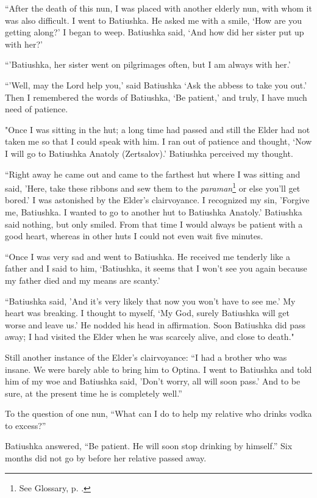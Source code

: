 “After the death of this nun, I was placed with another elderly nun, with whom it was also difficult. I went to Batiushka. He asked me with a smile, ‘How are you getting along?' I began to weep. Batiushka said, ‘And how did her sister put up with her?'

“'Batiushka, her sister went on pilgrimages often, but I am always with her.'

“'Well, may the Lord help you,' said Batiushka ‘Ask the abbess to take you out.' Then I remembered the words of Batiushka, ‘Be patient,' and truly, I have much need of patience.

"Once I was sitting in the hut; a long time had passed and still the Elder had not taken me so that I could speak with him. I ran out of patience and thought, ‘Now I will go to Batiushka Anatoly (Zertsalov).' Batiushka perceived my thought.

“Right away he came out and came to the farthest hut where I was sitting and said, 'Here, take these ribbons and sew them to the \textit{paraman}\footnote{See Glossary, p. \pageref{paraman}.} or else you'll get bored.' I was astonished by the Elder's clairvoyance. I recognized my sin, 'Forgive me, Batiushka. I wanted to go to another hut to Batiushka Anatoly.' Batiushka said nothing, but only smiled. From that time I would always be patient with a good heart, whereas in other huts I could not even wait five minutes.

“Once I was very sad and went to Batiushka. He received me tenderly like a father and I said to him, ‘Batiushka, it seems that I won't see you again because my father died and my means are scanty.'

“Batiushka said, 'And it's very likely that now you won't have to see me.' My heart was breaking. I thought to myself, ‘My God, surely Batiushka will get worse and leave us.' He nodded his head in affirmation. Soon Batiushka did pass away; I had visited the Elder when he was scarcely alive, and close to death."

Still another instance of the Elder's clairvoyance: “I had a brother who was insane. We were barely able to bring him to Optina. I went to Batiushka and told him of my woe and Batiushka said, 'Don't worry, all will soon pass.' And to be sure, at the present time he is completely well.”

To the question of one nun, “What can I do to help my relative who drinks vodka to excess?”

Batiushka answered, “Be patient. He will soon stop drinking by himself.” Six months did not go by before her relative passed away.

